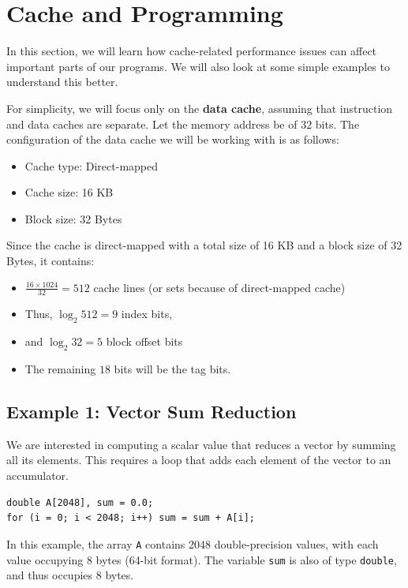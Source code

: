\documentclass[12pt]{book}
\begin{document}
\section{Cache and Programming}
In this section, we will learn how cache-related performance issues can affect important parts of our programs. We will also look at some simple examples to understand this better. 

For simplicity, we will focus only on the \textbf{data cache}, assuming that instruction and data caches are separate. Let the memory address be of $32$ bits. The configuration of the data cache we will be working with is as follows:
\begin{itemize}
    \item Cache type: Direct-mapped
    \item Cache size: 16 KB
    \item Block size: 32 Bytes
\end{itemize}

Since the cache is direct-mapped with a total size of 16 KB and a block size of 32 Bytes, it contains:
\begin{itemize}
    \item $\frac{16 \times 1024}{32} = 512$ cache lines (or sets because of direct-mapped cache)
    \item Thus, $\log_2 512 = 9$ index bits,
    \item and $\log_2 32 = 5$ block offset bits
    \item The remaining $18$ bits will be the tag bits.
\end{itemize}
\subsection{Example 1: Vector Sum Reduction}

We are interested in computing a scalar value that reduces a vector by summing all its elements. This requires a loop that adds each element of the vector to an accumulator.

\begin{lstlisting}[style=cppstyle, caption={Vector Sum Reduction}]
double A[2048], sum = 0.0;
for (i = 0; i < 2048; i++) sum = sum + A[i];
\end{lstlisting}

In this example, the array \texttt{A} contains 2048 double-precision values, with each value occupying $8$ bytes (64-bit format). The variable \texttt{sum} is also of type \texttt{double}, and thus occupies $8$ bytes.
\end{document}
